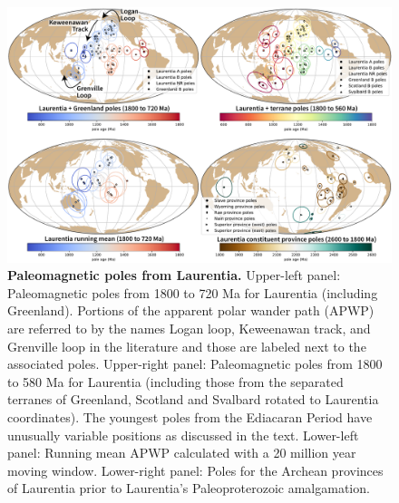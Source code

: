 \documentclass[twocolumn, switch]{article} %
\begin{document}
\begin{figure}
\centering
\includegraphics[width=\textwidth]{../Figures/Laurentia_poles_combined.pdf}
\caption{\textbf{Paleomagnetic poles from Laurentia.} Upper-left panel: Paleomagnetic poles from 1800 to 720 Ma for Laurentia (including Greenland). Portions of the apparent polar wander path (APWP) are referred to by the names Logan loop, Keweenawan track, and Grenville loop in the literature and those are labeled next to the associated poles. Upper-right panel:  Paleomagnetic poles from 1800 to 580 Ma for Laurentia (including those from the separated terranes of Greenland, Scotland and Svalbard rotated to Laurentia coordinates). The youngest poles from the Ediacaran Period have unusually variable positions as discussed in the text. Lower-left panel: Running mean APWP calculated with a 20 million year moving window. Lower-right panel: Poles for the Archean provinces of Laurentia prior to Laurentia's Paleoproterozoic amalgamation.}
\label{fig:Laurentia_poles}
\end{figure}
\end{document}
